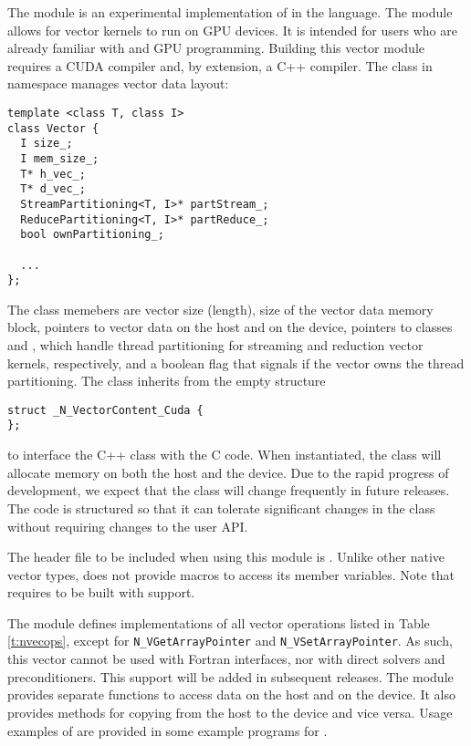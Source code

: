 %
The {\nveccuda} module is an experimental implementation of {\nvector} in the {\cuda} language. 
The module allows for {\sundials} vector kernels to run on GPU devices. It is intended for users 
who are already familiar with {\cuda} and GPU programming. Building this vector 
module requires a CUDA compiler and, by extension, a C++ compiler. The class  
in namespace  manages vector data layout: 
\begin{verbatim} 
template <class T, class I>
class Vector {
  I size_;
  I mem_size_;
  T* h_vec_;
  T* d_vec_;
  StreamPartitioning<T, I>* partStream_;
  ReducePartitioning<T, I>* partReduce_;
  bool ownPartitioning_;
  
  ...
};
\end{verbatim}
The class memebers are vector size (length), size of the vector data memory block, pointers
to vector data on the host and on the device, pointers to classes 
and , which handle thread partitioning for streaming and 
reduction vector kernels, respectively, and a boolean flag that signals if the
vector owns the thread partitioning. The class  inherits from the empty structure
\begin{verbatim} 
struct _N_VectorContent_Cuda {
};
\end{verbatim}
to interface the C++ class with the {\nvector} C code. When instantiated, the class
 will allocate memory on both the host and the device. Due to the rapid
progress of {\cuda} development, we expect that the 
class will change frequently in future {\sundials} releases. The code is
structured so that it can tolerate significant changes in the 
 class without requiring changes to the user API.


The header file to be included when using this module is .
Unlike other native {\sundials} vector types, {\nveccuda} does not provide macros 
to access its member variables.
Note that {\nveccuda} requires {\sundials} to be built with {\mpi} support.


The {\nveccuda} module defines implementations of all vector operations listed 
in Table \ref{t:nvecops}, except for \verb|N_VGetArrayPointer| and 
\verb|N_VSetArrayPointer|. 
As such, this vector cannot be used with {\sundials} Fortran interfaces,
nor with {\sundials} direct solvers and preconditioners. This support
will be added in subsequent {\sundials} releases. 
The {\nveccuda} module provides separate functions to access data on the host
and on the device. It also provides methods for copying from the host to 
the device and vice versa. Usage examples of {\nveccuda} are provided in
some example programs for {\cvode} \cite{cvode_ex}.

